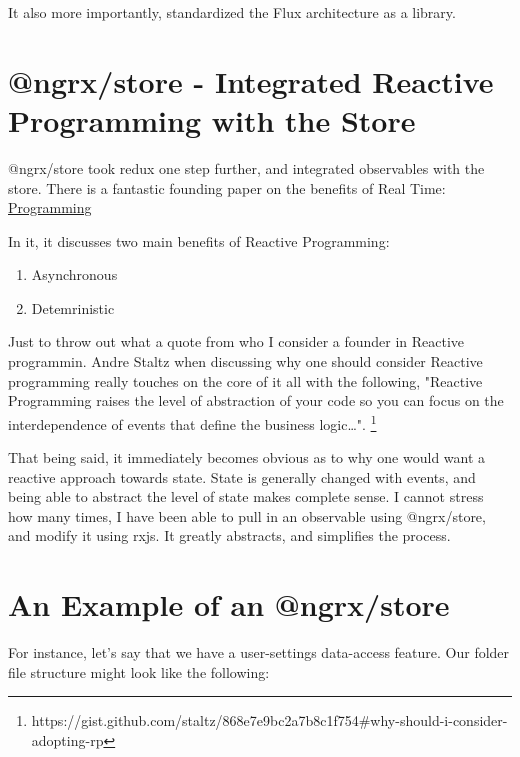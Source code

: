 It also more importantly, standardized the Flux architecture as a library.

\section{@ngrx/store - Integrated Reactive Programming with the Store}
@ngrx/store took redux one step further, and integrated observables with the
store. There is a fantastic founding paper on the benefits of Real Time:
\href{http://www-sop.inria.fr/members/Gerard.Berry/Papers/Berry-IFIP-89.pdf}{Programming}

In it, it discusses two main benefits of Reactive Programming:
\begin{enumerate}
  \item Asynchronous
  \item Detemrinistic
\end{enumerate}

Just to throw out what a quote from who I consider a founder in Reactive
programmin. Andre Staltz when discussing why one should consider Reactive
programming really touches on the core of it all with the following, "Reactive
Programming raises the level of abstraction of your code so you can focus on 
the interdependence of events that define the business logic\ldots".
\footnote{https://gist.github.com/staltz/868e7e9bc2a7b8c1f754\#why-should-i-consider-adopting-rp}

That being said, it immediately becomes obvious as to why one would want a
reactive approach towards state. State is generally changed with events, and
being able to abstract the level of state makes complete sense. I cannot stress
how many times, I have been able to pull in an observable using @ngrx/store, and
modify it using rxjs. It greatly abstracts, and simplifies the process.


\section{ An Example of an @ngrx/store }

For instance, let's say that we have a user-settings data-access feature. Our
folder file structure might look like the following:
% 

